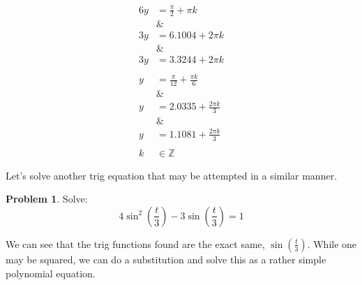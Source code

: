 \documentclass[12pt]{article}
\theoremstyle{definition}
\newtheorem{problem}{Problem}
\begin{document}
\begin{align}
    6y        & = \frac{\pi}{2} + \pi k            \\
    \nonumber & \&                                 \\
    3y        & = 6.1004 + 2\pi k                  \\
    \nonumber & \&                                 \\
    3y        & = 3.3244 + 2\pi k                  \\
    \nonumber                                      \\
    y         & = \frac{\pi}{12} + \frac{\pi k}{6} \\
    \nonumber & \&                                 \\
    y         & = 2.0335 + \frac{2\pi k}{3}        \\
    \nonumber & \&                                 \\
    y         & = 1.1081 + \frac{2\pi k}{3}        \\
    \nonumber                                      \\
    k         & \in \mathbb{Z}
\end{align}

Let's solve another trig equation that may be attempted in a similar manner.

\begin{problem}
Solve:
\begin{equation*}
    4\sin^2\left(\frac{t}{3}\right) - 3\sin\left(\frac{t}{3}\right) = 1 \label{eq:16}
\end{equation*}
\end{problem}

We can see that the trig functions found are the exact same, $\sin\left(\frac{t}{3}\right)$.
While one may be squared, we can do a substitution and solve this as a rather simple polynomial equation.
\end{document}
